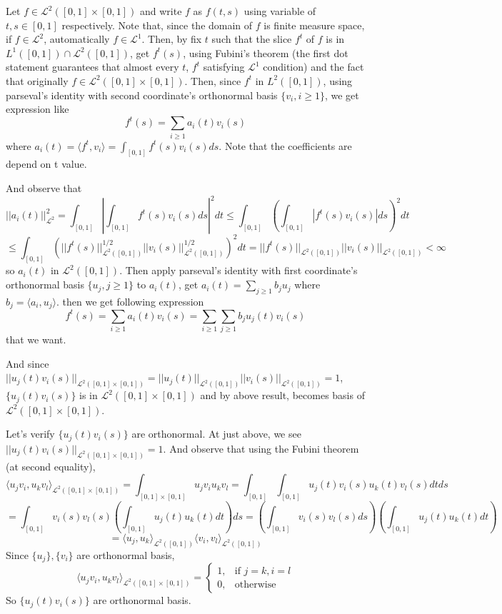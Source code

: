 \documentclass{article}
\begin{document}
Let $f\in \mathcal{L}^2([0,1]\times[0,1])$ and write $f$ as $f(t,s)$ using variable of $t,s\in[0,1]$ respectively.
Note that, since the domain of $f$ is finite measure space, if $f\in\mathcal{L}^2$, automatically $f\in\mathcal{L}^1$.
Then, by fix $t$ such that the slice $f^t$ of $f$ is in $L^1([0,1]) \cap \mathcal{L}^2([0,1])$, get $f^t(s)$,
using Fubini's theorem (the first dot statement guarantees that almost every $t$, $f^t$ satisfying $\mathcal{L}^1$ condition) and
the fact that originally $f\in \mathcal{L}^2([0,1]\times[0,1])$.
Then, since $f^t$ in $L^2([0,1])$, using parseval's identity with second coordinate's orthonormal basis $\{v_i, i\geq 1\}$,
we get expression like 
\[f^t(s)=\sum_{i\geq 1}a_i(t)v_i(s)\]
where \(a_i(t)=\langle f^t, v_i \rangle=\int_{[0,1]}f^t(s)v_i(s)ds\).
Note that the coefficients are depend on t value.

And observe that
\[||a_i(t)||^2_{\mathcal{L}^2}=\int_{[0,1]}|\int_{[0,1]}f^t(s)v_i(s)ds|^2dt
\leq \int_{[0,1]}(\int_{[0,1]}|f^t(s)v_i(s)|ds)^2dt\]
\[\leq \int_{[0,1]}(||f^t(s)||_{\mathcal{L}^2([0,1])}^{1/2}||v_i(s)||_{\mathcal{L}^2([0,1])}^{1/2})^2dt
=||f^t(s)||_{\mathcal{L}^2([0,1])}||v_i(s)||_{\mathcal{L}^2([0,1])}
< \infty\]
so $a_i(t)$ in $\mathcal{L}^2([0,1])$.
Then apply parseval's identity with first coordinate's orthonormal basis $\{u_j, j\geq 1\}$ to $a_i(t)$,
get $a_i(t)=\sum_{j \geq 1} b_ju_j$ where $b_j=\langle a_i, u_j\rangle$.
then we get following expression
\[f^t(s)=\sum_{i\geq 1}a_i(t)v_i(s)=\sum_{i\geq 1}\sum_{j \geq 1} b_ju_j(t)v_i(s)\]
that we want.

And since $||u_j(t)v_i(s)||_{\mathcal{L}^2([0,1]\times[0,1])}=||u_j(t)||_{\mathcal{L}^2([0,1])}||v_i(s)||_{\mathcal{L}^2([0,1])}=1$,
$\{u_j(t)v_i(s)\}$ is in $\mathcal{L}^2([0,1]\times[0,1])$ and by above result, becomes basis of $\mathcal{L}^2([0,1]\times[0,1])$.

Let's verify $\{u_j(t)v_i(s)\}$ are orthonormal. At just above, we see $||u_j(t)v_i(s)||_{\mathcal{L}^2([0,1]\times[0,1])}=1$.
And observe that using the Fubini theorem (at second equality),
\[\langle u_jv_i, u_kv_l \rangle_{\mathcal{L}^2([0,1]\times[0,1])} =\int_{[0,1]\times[0,1]} u_jv_iu_kv_l = \int_{[0,1]}\int_{[0,1]} u_j(t)v_i(s)u_k(t)v_l(s)dt ds\]
\[=\int_{[0,1]} v_i(s)v_l(s) (\int_{[0,1]} u_j(t)u_k(t) dt) ds=(\int_{[0,1]} v_i(s)v_l(s)ds) (\int_{[0,1]} u_j(t)u_k(t) dt) \]
\[= \langle u_j, u_k \rangle_{\mathcal{L}^2([0,1])} \langle v_i, v_l \rangle_{\mathcal{L}^2([0,1])}\]
Since $\{u_j\}, \{v_i\}$ are orthonormal basis, 
\[
    \langle u_jv_i, u_kv_l \rangle_{\mathcal{L}^2([0,1]\times[0,1])}=
\begin{cases}
    1, & \text{if } j=k,i=l \\ 
    0, & \text{otherwise}
\end{cases}
\]
So $\{u_j(t)v_i(s)\}$ are orthonormal basis.
\end{document}
